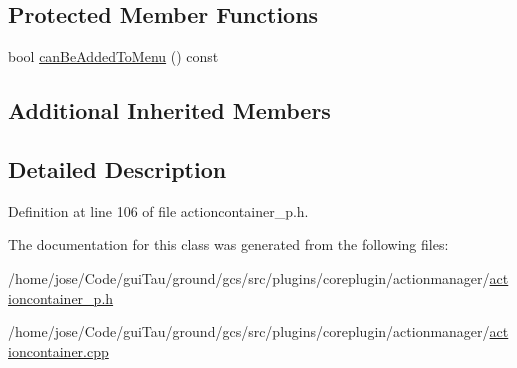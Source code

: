 \subsection*{Protected Member Functions}
\begin{DoxyCompactItemize}
\item 
bool \hyperlink{group___core_plugin_ga8c3e7c1cd1afcdb0653f62666d751955}{can\-Be\-Added\-To\-Menu} () const 
\end{DoxyCompactItemize}
\subsection*{Additional Inherited Members}


\subsection{Detailed Description}


Definition at line 106 of file actioncontainer\-\_\-p.\-h.



The documentation for this class was generated from the following files\-:\begin{DoxyCompactItemize}
\item 
/home/jose/\-Code/gui\-Tau/ground/gcs/src/plugins/coreplugin/actionmanager/\hyperlink{actioncontainer__p_8h}{actioncontainer\-\_\-p.\-h}\item 
/home/jose/\-Code/gui\-Tau/ground/gcs/src/plugins/coreplugin/actionmanager/\hyperlink{actioncontainer_8cpp}{actioncontainer.\-cpp}\end{DoxyCompactItemize}
